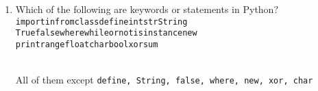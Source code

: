 \begin{enumerate}
\item Which of the following are keywords or statements in Python?\\
\texttt{import\hspace{10mm}in\hspace{10mm}from\hspace{10mm}class\hspace{10mm}define\hspace{10mm}int\hspace{10mm}str\hspace{10mm}String}\\
\texttt{True\hspace{9mm}false\hspace{9mm}where\hspace{9mm}while\hspace{9mm}or\hspace{9mm}not\hspace{9mm}isinstance\hspace{9mm}new}\\
\texttt{print\hspace{13mm}range\hspace{13mm}float\hspace{13mm}char\hspace{13mm}bool\hspace{13mm}xor\hspace{13mm}sum}\\
\\
\begin{answer}
All of them except \texttt{define, String, false, where, new, xor, char}
\end{answer}
\end{enumerate}



